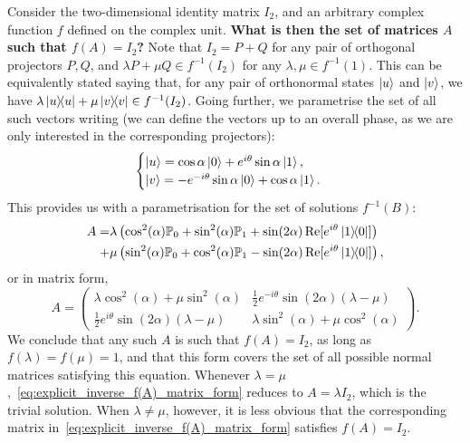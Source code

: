 \begin{example}
\label{ex:solutions_f(A)=I2}
Consider the two-dimensional identity matrix $I_2$, and an arbitrary complex function $f$ defined on the complex unit. \textbf{What is then the set of matrices $A$ such that $f(A)=I_2$?}
Note that $I_2=P+Q$ for any pair of orthogonal projectors $P,Q$, and $\lambda P + \mu Q\in f^{-1}(I_2)$ for any $\lambda,\mu\in f^{-1}(1)$.
This can be equivalently stated saying that, for any pair of orthonormal states $\ket u$ and $\ket v$, we have
$\lambda \ketbra u + \mu \ketbra v\in f^{-1}(I_2)$.
Going further, we parametrise the set of all such vectors writing (we can define the vectors up to an overall phase, as we are only interested in the corresponding projectors):
\begin{equation}
    \begin{cases}
    \ket u =\cos\alpha\ket 0+e^{i\theta}\sin\alpha \ket 1, \\
    \ket v =-e^{-i\theta}\sin\alpha\ket 0 + \cos\alpha\ket 1.
\end{cases}
\end{equation}
This provides us with a parametrisation for the set of solutions $f^{-1}(B)$:
\begin{equation}
\begin{aligned}
    A = &\lambda\left(\cos^2(\alpha) \mathbb{P}_0 + \sin^2(\alpha) \mathbb{P}_1 + \sin(2\alpha)\Re[e^{i\theta}\ketbra{1}{0}]\right) \\
    +&\mu\left(
        \sin^2(\alpha) \mathbb{P}_0 + \cos^2(\alpha) \mathbb{P}_1 - \sin(2\alpha)\Re[e^{i\theta}\ketbra{1}{0}]
    \right),
\end{aligned}
\end{equation}
or in matrix form,
\begin{equation}
    A = \begin{pmatrix}
        \lambda \cos^2(\alpha)+\mu\sin^2(\alpha) &
        \frac12 e^{-i\theta} \sin(2\alpha) (\lambda-\mu) \\ 
        \frac12 e^{i\theta} \sin(2\alpha) (\lambda-\mu) &
        \lambda \sin^2(\alpha)+\mu\cos^2(\alpha)
    \end{pmatrix}.
    \label{eq:explicit_inverse_f(A)_matrix_form}
\end{equation}
We conclude that any such $A$ is such that $f(A)=I_2$, as long as $f(\lambda)=f(\mu)=1$, and that this form covers the set of all possible normal matrices satisfying this equation.
Whenever $\lambda=\mu$,~\cref{eq:explicit_inverse_f(A)_matrix_form} reduces to $A=\lambda I_2$, which is the trivial solution. When $\lambda\neq\mu$, however, it is less obvious that the corresponding matrix in~\cref{eq:explicit_inverse_f(A)_matrix_form} satisfies $f(A)=I_2$.
\end{example}

